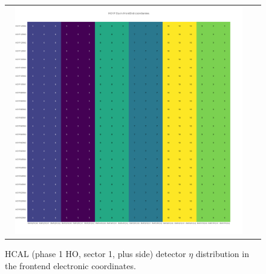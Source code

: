 \begin{figure}[htb]
 \begin{center}
  \begin{tabular}{cc}
   \includegraphics[angle=0,width=0.95\textwidth]{figures/appendix/HO1P_Eta_in_FrontEnd.png}
  \end{tabular}
  \caption{HCAL (phase 1 HO, sector 1, plus side) detector $\eta$ distribution in the frontend electronic coordinates.}
  \label{fig:lmapHO1PEtaFEC}
 \end{center}
\end{figure}
\clearpage


